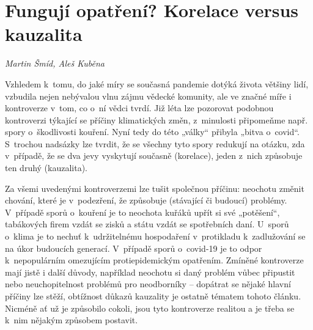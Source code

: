 

\chapter{Fungují opatření? Korelace versus kauzalita} \label{Co_na_cem_zavisi}

\textit{Martin Šmíd, Aleš Kuběna}
\vspace{15mm}

\noindent Vzhledem k~tomu, do jaké míry se současná pandemie dotýká života většiny lidí, vzbudila nejen nebývalou vlnu zájmu vědecké komunity, ale ve značné míře i kontroverze v~tom, co o~ní vědci tvrdí. Již léta lze pozorovat podobnou kontroverzi týkající se příčiny klimatických změn, z~minulosti připomeňme např. spory o~škodlivosti kouření. Nyní tedy do této „války“ přibyla „bitva o~covid“. S~trochou nadsázky lze tvrdit, že se všechny tyto spory redukují na otázku, zda v~případě, že se dva jevy vyskytují současně (korelace), jeden z~nich způsobuje ten druhý (kauzalita).

Za všemi uvedenými kontroverzemi lze tušit společnou příčinu: neochotu změnit chování, které je v~podezření, že způsobuje (stávající či budoucí) problémy. V~případě sporů o~kouření je to neochota kuřáků upřít si své „potěšení“, tabákových firem vzdát se zisků a státu vzdát se spotřebních daní. U~sporů o~klima je to nechuť k~udržitelnému hospodaření v~protikladu k~zadlužování se na úkor budoucích generací. V~případě sporů o~covid-19 je to odpor k~nepopulárním omezujícím protiepidemickým
opatřením. Zmíněné kontroverze mají jistě i další důvody, například neochotu si daný problém vůbec připustit nebo neuchopitelnost problémů pro neodborníky -- dopátrat se nějaké hlavní příčiny lze stěží, obtížnost důkazů kauzality je ostatně tématem tohoto článku. Nicméně ať už je způsobilo cokoli, jsou tyto kontroverze realitou a je třeba se k~nim nějakým způsobem postavit.

